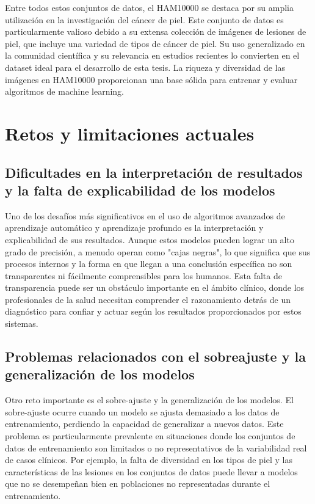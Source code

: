Entre todos estos conjuntos de datos, el HAM10000 se destaca por su amplia utilización en la investigación del cáncer de piel. Este conjunto de datos es particularmente valioso debido a su extensa colección de imágenes de lesiones de piel, que incluye una variedad de tipos de cáncer de piel. Su uso generalizado en la comunidad científica y su relevancia en estudios recientes lo convierten en el dataset ideal para el desarrollo de esta tesis. La riqueza y diversidad de las imágenes en HAM10000 proporcionan una base sólida para entrenar y evaluar algoritmos de machine learning.

\section{Retos y limitaciones actuales}

\subsection{Dificultades en la interpretación de resultados y la falta de explicabilidad de los modelos}

Uno de los desafíos más significativos en el uso de algoritmos avanzados de aprendizaje automático y aprendizaje profundo es la interpretación y explicabilidad de sus resultados. Aunque estos modelos pueden lograr un alto grado de precisión, a menudo operan como "cajas negras", lo que significa que sus procesos internos y la forma en que llegan a una conclusión específica no son transparentes ni fácilmente comprensibles para los humanos. Esta falta de transparencia puede ser un obstáculo importante en el ámbito clínico, donde los profesionales de la salud necesitan comprender el razonamiento detrás de un diagnóstico para confiar y actuar según los resultados proporcionados por estos sistemas. 


\subsection{Problemas relacionados con el sobreajuste y la generalización de los modelos}
Otro reto importante es el sobre-ajuste y la generalización de los modelos. El sobre-ajuste ocurre cuando un modelo se ajusta demasiado a los datos de entrenamiento, perdiendo la capacidad de generalizar a nuevos datos. Este problema es particularmente prevalente en situaciones donde los conjuntos de datos de entrenamiento son limitados o no representativos de la variabilidad real de casos clínicos. Por ejemplo, la falta de diversidad en los tipos de piel y las características de las lesiones en los conjuntos de datos puede llevar a modelos que no se desempeñan bien en poblaciones no representadas durante el entrenamiento. 

